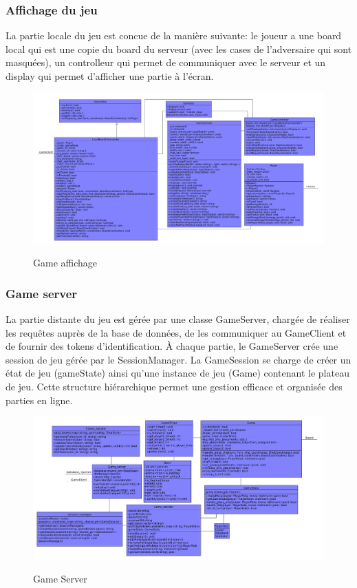 \documentclass[../design_fonctionnement_sys.tex]{subfiles}
\begin{document}
\subsubsection{Affichage du jeu}
La partie locale du jeu est concue de la manière suivante: 
le joueur a une board local qui est une copie du board du serveur (avec les cases de l'adversaire qui sont masquées), 
un controlleur qui permet de communiquer avec le serveur et un display qui permet d'afficher une partie à l'écran.
\begin{figure}[H]
    \centering
    \includegraphics[scale=0.2]{img_design/4.8_affichage_game.png}
    \label{fig:seq_match_server}
    \caption{Game affichage}
\end{figure}

\newpage
\subsubsection{Game server}
La partie distante du jeu est gérée par une classe GameServer, chargée de réaliser les requêtes auprès de la base de données, 
de les communiquer au GameClient et de fournir des tokens d'identification. À chaque partie, le GameServer crée une session de jeu gérée par le SessionManager. 
La GameSession se charge de créer un état de jeu (gameState) ainsi qu'une instance de jeu (Game) contenant le plateau de jeu. Cette structure hiérarchique permet une gestion efficace et organisée des parties en ligne.
\begin{figure}[H]
    \centering
    \includegraphics[scale=0.3]{img_design/4.9.1_game_server_design.png}
    \label{fig:seq_match_server}
    \caption{Game Server}
\end{figure}
\end{document}
